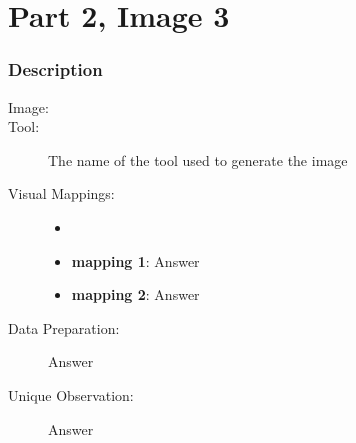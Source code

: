 \hypertarget{part-2-image-3}{%
\section{Part 2, Image 3}\label{part-1-design-2}}

\centering


\hypertarget{description}{%
	\subsubsection{Description}\label{description}}

\begin{description}
	\item[Image:]
	\item[Tool:]
	The name of the tool used to generate the image
	\item[Visual Mappings:]
	\begin{itemize}
		\tightlist
		\item[ ]
	\end{itemize}
	\begin{itemize}
		\tightlist
		\item
		\textbf{mapping 1}: Answer
	\end{itemize}
	
	\begin{itemize}
		\tightlist
		\item
		\textbf{mapping 2}: Answer
	\end{itemize}
	\item[Data Preparation:] Answer
	\item[Unique Observation:]
	Answer
	
\end{description}